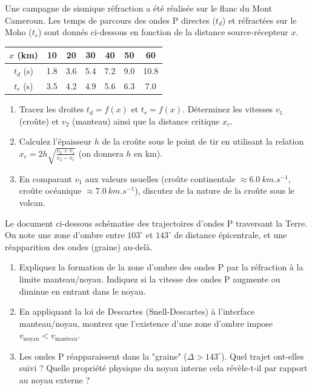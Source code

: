 \documentclass[11pt]{article}
\begin{document}
\begin{exercice}
\noindent Une campagne de sismique réfraction a été réalisée sur le flanc du Mont Cameroun. Les temps de parcours des ondes P directes ($t_d$) et réfractées sur le Moho ($t_r$) sont donnés ci-dessous en fonction de la distance source-récepteur $x$.

\begin{center}
\begin{tabular}{|c|c|c|c|c|c|c|}
\hline
$x$ (km) & 10 & 20 & 30 & 40 & 50 & 60 \\
\hline
$t_d$ (s) & 1.8 & 3.6 & 5.4 & 7.2 & 9.0 & 10.8 \\
\hline
$t_r$ (s) & 3.5 & 4.2 & 4.9 & 5.6 & 6.3 & 7.0 \\
\hline
\end{tabular}
\end{center}

\begin{enumerate}
    \item Tracez les droites $t_d = f(x)$ et $t_r = f(x)$. Déterminez les vitesses $v_1$ (croûte) et $v_2$ (manteau) ainsi que la distance critique $x_c$.
    \item Calculez l'épaisseur $h$ de la croûte sous le point de tir en utilisant la relation $x_c = 2h \sqrt{\frac{v_2+v_1}{v_2-v_1}}$ (on donnera $h$ en km).
    \item En comparant $v_1$ aux valeurs usuelles (croûte continentale $\approx \SI{6.0}{km.s^{-1}}$, croûte océanique $\approx \SI{7.0}{km.s^{-1}}$), discutez de la nature de la croûte sous le volcan.
\end{enumerate}
\end{exercice}

\begin{exercice}
\noindent Le document ci-dessous schématise des trajectoires d'ondes P traversant la Terre. On note une zone d'ombre entre $103^\circ$ et $143^\circ$ de distance épicentrale, et une réapparition des ondes (graine) au-delà.

\begin{enumerate}
    \item Expliquez la formation de la zone d'ombre des ondes P par la réfraction à la limite manteau/noyau. Indiquez si la vitesse des ondes P augmente ou diminue en entrant dans le noyau.
    \item En appliquant la loi de Descartes (Snell-Descartes) à l'interface manteau/noyau, montrez que l'existence d'une zone d'ombre impose $v_{\text{noyau}} < v_{\text{manteau}}$.
    \item Les ondes P réapparaissent dans la "graine" ($\Delta > 143^\circ$). Quel trajet ont-elles suivi ? Quelle propriété physique du noyau interne cela révèle-t-il par rapport au noyau externe ?
\end{enumerate}
\end{exercice}
\end{document}
